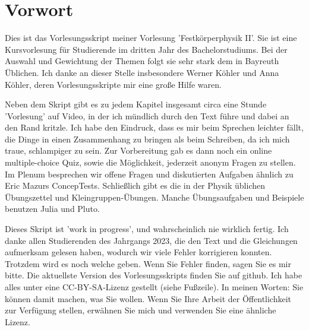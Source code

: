 \renewcommand{\lastmod}{\ \ }
\renewcommand{\chapterauthors}{\ \ }

\chapter*{Vorwort}

Dies ist das Vorlesungsskript meiner Vorlesung 'Festkörperphysik II'. Sie ist eine Kursvorlesung für  Studierende im dritten Jahr des Bachelorstudiums. Bei der Auswahl und Gewichtung der Themen folgt sie sehr stark dem in Bayreuth Üblichen. Ich danke an dieser Stelle insbesondere Werner Köhler und Anna Köhler, deren Vorlesungsskripte mir eine große Hilfe waren.

Neben dem Skript gibt es zu jedem Kapitel  insgesamt circa eine Stunde 'Vorlesung' auf Video, in der ich mündlich durch den Text führe und dabei an den Rand kritzle.
Ich habe den Eindruck, dass es mir beim Sprechen leichter fällt, die Dinge in einen Zusammenhang zu bringen als beim Schreiben, da ich mich traue, schlampiger zu sein. Zur Vorbereitung gab es dann noch ein online multiple-choice Quiz, sowie die Möglichkeit, jederzeit anonym Fragen zu stellen.  Im Plenum  besprechen wir offene Fragen und diskutierten Aufgaben ähnlich zu Eric Mazurs 
ConcepTests.  Schließlich gibt es die in der Physik üblichen Übungszettel und Kleingruppen-Übungen. Manche Übungsaufgaben und Beispiele benutzen Julia  und Pluto. 



Dieses Skript ist 'work in progress', und wahrscheinlich nie wirklich fertig.  Ich danke allen Studierenden des Jahrgangs 2023, die den Text und die Gleichungen aufmerksam gelesen haben, wodurch wir viele Fehler korrigieren konnten. Trotzdem wird es noch welche geben. Wenn Sie Fehler finden, sagen Sie es mir bitte. 
Die aktuellste Version des Vorlesungsskripts finden Sie auf github.  Ich habe alles unter eine CC-BY-SA-Lizenz gestellt (siehe Fußzeile). In meinen Worten: Sie können damit machen, was Sie wollen. Wenn Sie Ihre Arbeit der Öffentlichkeit zur Verfügung stellen, erwähnen Sie mich und verwenden Sie eine ähnliche Lizenz. 


